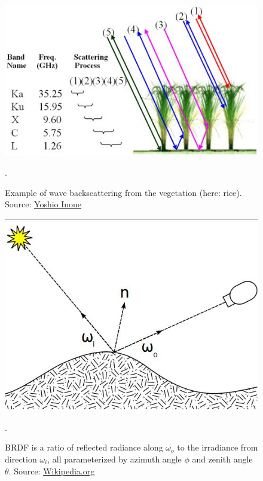 \documentclass[11pt]{article}
\begin{document}
\begin{appendices}
\begin{figure}[H]
	\begin{center}
		\includegraphics[scale=0.6]{backscattering.jpg}
		\caption{Example of wave backscattering from the vegetation (here: rice). Source: \href{http://cse.niaes.affrc.go.jp/miwa/esid/highlight/microwave-backscatter.html}{Yoshio Inoue}}.\label{fig:backscat}
	\end{center}
\end{figure}
\begin{figure}[H]
	\begin{center}
		\includegraphics[scale=0.4]{BRDF.jpg}
		\caption{BRDF is a ratio of reflected radiance along $\omega_o$ to the irradiance from direction $\omega_i$, all parameterized by azimuth angle $\phi$ and zenith angle $\theta$. Source: \href{http://en.wikipedia.org/wiki/Portal:Contents/Quick_index}{Wikipedia.org}}.\label{fig:BRDF}
	\end{center}
\end{figure}


\end{appendices}
\end{document}
